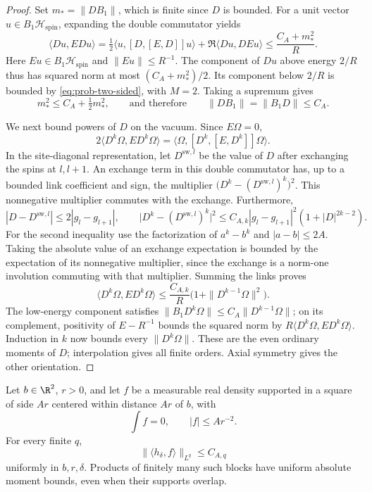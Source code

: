 \begin{proof}
Set \(m_* =\|DB_1\|\), which is finite since \(D\) is bounded.
For a unit vector \(u\in B_1\mathcal H_{\mathrm{spin}}\), expanding the double
commutator yields
\[
 \langle Du,EDu\rangle
 =\tfrac12\langle u,[D,[E,D]]u\rangle
      +\Re\langle Du,DEu\rangle
 \le \frac{C_A+m_*^2}{R}.
\]
Here \(Eu\in B_1\mathcal H_{\mathrm{spin}}\) and \(\|Eu\|\le R^{-1}\).
The component of \(Du\) above energy \(2/R\) thus has squared norm at
most \((C_A+m_*^2)/2\). Its component below \(2/R\) is bounded by
\eqref{eq:prob-two-sided}, with \(M=2\). Taking a supremum gives
\[
 m_*^2\le C_A+\tfrac12m_*^2,
 \qquad\text{and therefore}\qquad
 \|DB_1\|=\|B_1D\|\le C_A.
\]

We next bound powers of \(D\) on the vacuum. Since \(E\Omega=0\),
\[
 2\langle D^k\Omega,ED^k\Omega\rangle
 =\langle\Omega,[D^k,[E,D^k]]\Omega\rangle.
\]
In the site-diagonal representation, let \(D^{\mathrm{sw},l}\) be the
value of \(D\) after exchanging the spins at \(l,l+1\). An exchange
term in this double commutator has, up to a bounded link coefficient
and sign, the multiplier
\(\bigl(D^k-(D^{\mathrm{sw},l})^k\bigr)^2\).
This nonnegative multiplier commutes with the exchange. Furthermore,
\[
 |D-D^{\mathrm{sw},l}|\le2|g_l-g_{l+1}|,
 \qquad
 \bigl|D^k-(D^{\mathrm{sw},l})^k\bigr|^2
 \le C_{A,k}|g_l-g_{l+1}|^2(1+|D|^{2k-2}).
\]
For the second inequality use the factorization of \(a^k-b^k\) and
\(|a-b|\le2A\). Taking the absolute value of an exchange expectation
is bounded by the expectation of its nonnegative multiplier, since the
exchange is a norm-one involution commuting with that multiplier.
Summing the links proves
\begin{equation}\label{eq:prob-power-energy}
 \langle D^k\Omega,ED^k\Omega\rangle
 \le \frac{C_{A,k}}R
       \bigl(1+\|D^{k-1}\Omega\|^2\bigr).
\end{equation}
The low-energy component satisfies
\(\|B_1D^k\Omega\|\le C_A\|D^{k-1}\Omega\|\); on its complement,
positivity of \(E-R^{-1}\) bounds the squared norm by
\(R\langle D^k\Omega,ED^k\Omega\rangle\).
Induction in \(k\) now bounds every \(\|D^k\Omega\|\).
These are the even ordinary moments of \(D\); interpolation gives all
finite orders. Axial symmetry gives the other orientation.
\end{proof}

\begin{corollary}\label{cor:neutral-blocks}
Let \(b\in\R^2\), \(r>0\), and let \(f\) be a measurable real density
supported in a square of side \(Ar\) centered within distance \(Ar\)
of \(b\), with
\[
 \int f=0,\qquad |f|\le A r^{-2}.
\]
For every finite \(q\),
\begin{equation}\label{eq:prob-neutral-block}
 \|\langle h_\delta,f\rangle\|_{L^q}\le C_{A,q}
\end{equation}
uniformly in \(b,r,\delta\). Products of finitely many such blocks have
uniform absolute moment bounds, even when their supports overlap.
\end{corollary}

